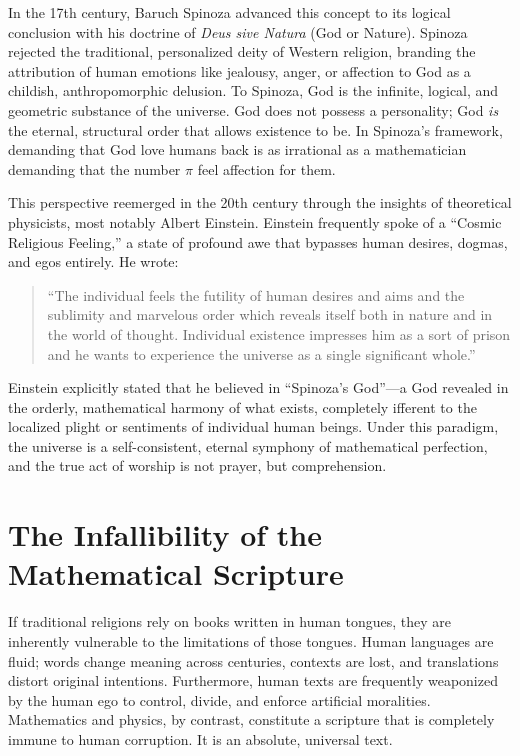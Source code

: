 \documentclass[12pt]{article}
\begin{document}
In the 17th century, Baruch Spinoza advanced this concept to its logical conclusion with his doctrine of \textit{Deus sive Natura} (God or Nature). Spinoza rejected the traditional, personalized deity of Western religion, branding the attribution of human emotions like jealousy, anger, or affection to God as a childish, anthropomorphic delusion. To Spinoza, God is the infinite, logical, and geometric substance of the universe. God does not possess a personality; God \textit{is} the eternal, structural order that allows existence to be. In Spinoza's framework, demanding that God love humans back is as irrational as a mathematician demanding that the number $\pi$ feel affection for them.

This perspective reemerged in the 20th century through the insights of theoretical physicists, most notably Albert Einstein. Einstein frequently spoke of a ``Cosmic Religious Feeling,'' a state of profound awe that bypasses human desires, dogmas, and egos entirely. He wrote:
\begin{quote}
``The individual feels the futility of human desires and aims and the sublimity and marvelous order which reveals itself both in nature and in the world of thought. Individual existence impresses him as a sort of prison and he wants to experience the universe as a single significant whole.''
\end{quote}

Einstein explicitly stated that he believed in ``Spinoza's God''—a God revealed in the orderly, mathematical harmony of what exists, completely ifferent to the localized plight or sentiments of individual human beings. Under this paradigm, the universe is a self-consistent, eternal symphony of mathematical perfection, and the true act of worship is not prayer, but comprehension.

\section{The Infallibility of the Mathematical Scripture}
If traditional religions rely on books written in human tongues, they are inherently vulnerable to the limitations of those tongues. Human languages are fluid; words change meaning across centuries, contexts are lost, and translations distort original intentions. Furthermore, human texts are frequently weaponized by the human ego to control, divide, and enforce artificial moralities. Mathematics and physics, by contrast, constitute a scripture that is completely immune to human corruption. It is an absolute, universal text.
\end{document}
